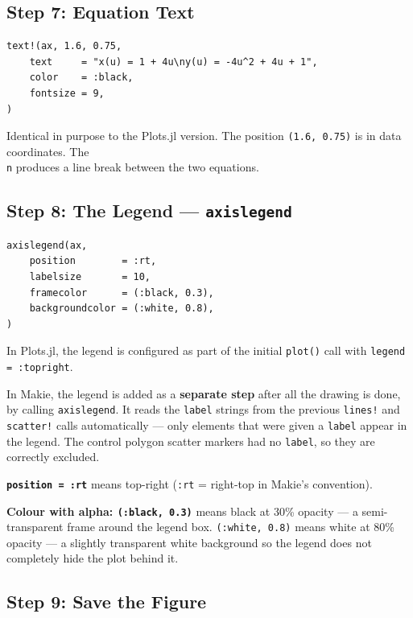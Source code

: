 \documentclass[12pt, a4paper]{article}
\newcommand{\cd}[1]{\texttt{#1}}
\begin{document}
\subsection{Step 7: Equation Text}

\begin{verbatim}
text!(ax, 1.6, 0.75,
    text     = "x(u) = 1 + 4u\ny(u) = -4u^2 + 4u + 1",
    color    = :black,
    fontsize = 9,
)
\end{verbatim}

Identical in purpose to the Plots.jl version.
The position \cd{(1.6, 0.75)} is in data coordinates.
The \cd{\\n} produces a line break between the two equations.

\subsection{Step 8: The Legend --- \texttt{axislegend}}

\begin{verbatim}
axislegend(ax,
    position        = :rt,
    labelsize       = 10,
    framecolor      = (:black, 0.3),
    backgroundcolor = (:white, 0.8),
)
\end{verbatim}

In Plots.jl, the legend is configured as part of the
initial \cd{plot()} call with \cd{legend = :topright}.

In Makie, the legend is added as a \textbf{separate step}
after all the drawing is done, by calling \cd{axislegend}.
It reads the \cd{label} strings from the previous
\cd{lines!} and \cd{scatter!} calls automatically ---
only elements that were given a \cd{label} appear in the legend.
The control polygon scatter markers had no \cd{label},
so they are correctly excluded.

\textbf{\cd{position = :rt}} means top-right
(\cd{:rt} = right-top in Makie's convention).

\textbf{Colour with alpha: \cd{(:black, 0.3)}}
means black at 30\% opacity --- a semi-transparent
frame around the legend box.
\cd{(:white, 0.8)} means white at 80\% opacity ---
a slightly transparent white background so the legend
does not completely hide the plot behind it.

\subsection{Step 9: Save the Figure}
\end{document}
